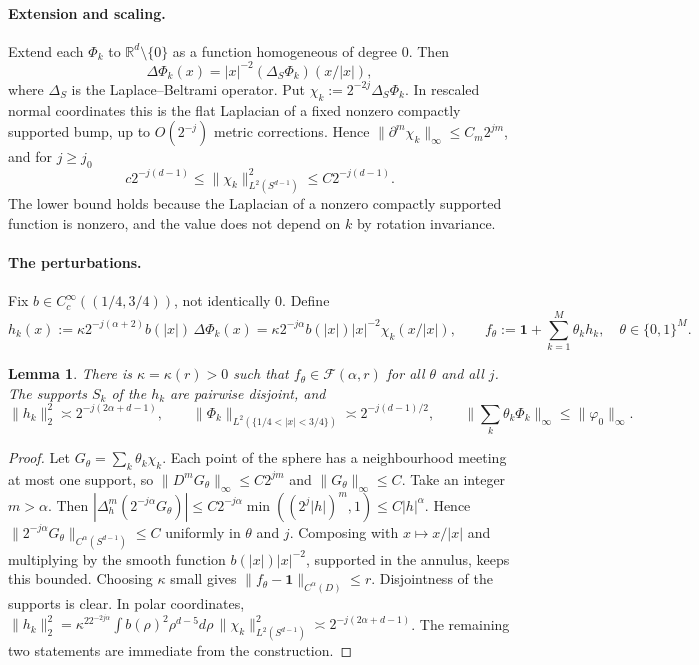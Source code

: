 \documentclass[11pt]{article}
\newtheorem{lemma}[theorem]{Lemma}
\theoremstyle{definition}
\theoremstyle{remark}
\newcommand{\R}{\mathbb R}
\newcommand{\one}{\mathbf 1}
\newcommand{\Fc}{\mathcal F}
\begin{document}
\paragraph{Extension and scaling.} Extend each $\Phi_k$ to $\R^d\setminus\{0\}$ as a function homogeneous of degree $0$. Then
\[
\Delta\Phi_k(x)=|x|^{-2}(\Delta_S\Phi_k)(x/|x|),
\]
where $\Delta_S$ is the Laplace--Beltrami operator. Put $\chi_k:=2^{-2j}\Delta_S\Phi_k$. In rescaled normal coordinates this is the flat Laplacian of a fixed nonzero compactly supported bump, up to $O(2^{-j})$ metric corrections. Hence $\|\partial^m\chi_k\|_\infty\le C_m2^{jm}$, and for $j\ge j_0$
\[
c2^{-j(d-1)}\le\|\chi_k\|^2_{L^2(S^{d-1})}\le C2^{-j(d-1)} .
\]
The lower bound holds because the Laplacian of a nonzero compactly supported function is nonzero, and the value does not depend on $k$ by rotation invariance.

\paragraph{The perturbations.} Fix $b\in C^\infty_c((1/4,3/4))$, not identically $0$. Define
\[
h_k(x):=\kappa2^{-j(\alpha+2)}b(|x|)\,\Delta\Phi_k(x)=\kappa2^{-j\alpha}b(|x|)|x|^{-2}\chi_k(x/|x|),
\qquad f_\theta:=\one+\sum_{k=1}^M\theta_kh_k,\quad\theta\in\{0,1\}^M .
\]

\begin{lemma}\label{lem:cube}
There is $\kappa=\kappa(r)>0$ such that $f_\theta\in\Fc(\alpha,r)$ for all $\theta$ and all $j$. The supports $S_k$ of the $h_k$ are pairwise disjoint, and
\[
\|h_k\|_2^2\asymp2^{-j(2\alpha+d-1)},\qquad\|\Phi_k\|_{L^2(\{1/4<|x|<3/4\})}\asymp2^{-j(d-1)/2},\qquad\Big\|\sum_k\theta_k\Phi_k\Big\|_\infty\le\|\varphi_0\|_\infty .
\]
\end{lemma}

\begin{proof}
Let $G_\theta=\sum_k\theta_k\chi_k$. Each point of the sphere has a neighbourhood meeting at most one support, so $\|D^mG_\theta\|_\infty\le C2^{jm}$ and $\|G_\theta\|_\infty\le C$. Take an integer $m>\alpha$. Then
$|\Delta^m_h(2^{-j\alpha}G_\theta)|\le C2^{-j\alpha}\min((2^j|h|)^m,1)\le C|h|^\alpha$.
Hence $\|2^{-j\alpha}G_\theta\|_{C^\alpha(S^{d-1})}\le C$ uniformly in $\theta$ and $j$. Composing with $x\mapsto x/|x|$ and multiplying by the smooth function $b(|x|)|x|^{-2}$, supported in the annulus, keeps this bounded. Choosing $\kappa$ small gives $\|f_\theta-\one\|_{C^\alpha(D)}\le r$. Disjointness of the supports is clear. In polar coordinates,
$\|h_k\|^2_2=\kappa^22^{-2j\alpha}\int b(\rho)^2\rho^{d-5}d\rho\,\|\chi_k\|^2_{L^2(S^{d-1})}\asymp2^{-j(2\alpha+d-1)}$.
The remaining two statements are immediate from the construction.
\end{proof}
\end{document}
